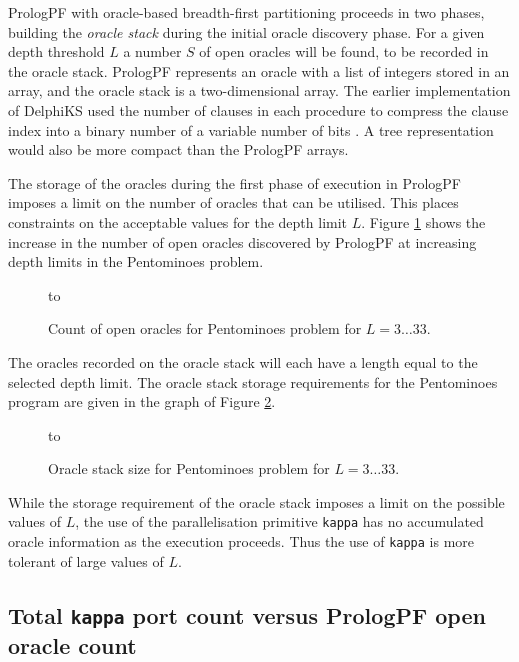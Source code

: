 PrologPF with oracle-based breadth-first partitioning
proceeds in two phases, building the \textit{oracle stack} during the
initial oracle discovery phase.  For a given depth threshold $L$ a number $S$ of
open oracles will be found, to be recorded in the oracle stack.  PrologPF represents
an oracle with a list of integers stored in an array, and the oracle stack is a
two-dimensional array.  The earlier implementation of DelphiKS used the number of
clauses in each procedure to compress the clause index into a binary number of
a variable number of bits \cite{Kle91}.  A tree representation would also be
more compact than the PrologPF arrays.

The storage of the oracles during the first phase of execution in PrologPF imposes
a limit on the number of oracles that can be utilised.  This places constraints on
the acceptable values for the depth limit $L$.  Figure \ref{pent_orc_count} shows the
increase in the number of open oracles discovered by PrologPF at increasing depth
limits in the Pentominoes problem.

\begin{figure}[htbp]
\vspace{5mm} \hbox to 
\caption{Count of open oracles for Pentominoes problem for $L=3\ldots 33$.}
\vspace{5mm}
\label{pent_orc_count}
\end{figure}

The oracles recorded on the oracle stack will each have a length equal to the selected
depth limit.  The oracle stack storage requirements for the Pentominoes program are
given in the graph of Figure \ref{pent_orc_storage}.

\begin{figure}[htbp]
\vspace{5mm} \hbox to 
\caption{Oracle stack size for Pentominoes problem for $L=3\ldots 33$.}
\vspace{5mm}
\label{pent_orc_storage}
\end{figure}

While the storage requirement of the oracle stack imposes a limit on the possible values
of $L$, the use of the parallelisation primitive \texttt{kappa} has no accumulated oracle
information as the execution proceeds.  Thus the use of \texttt{kappa} is more tolerant of
large values of $L$. 

\subsection{Total \texttt{kappa} port count versus PrologPF open oracle count}

